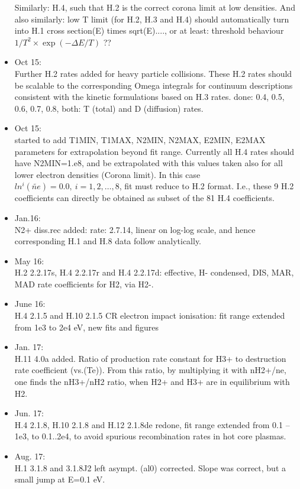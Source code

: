 \documentclass[12pt,dvipdfmx]{article}
\begin{document}
\begin{itemize}
 Similarly: H.4, such that H.2 is the correct corona limit at low densities. And also similarly: low T limit (for H.2, H.3 and H.4)
 should automatically turn into H.1 cross section(E) times sqrt(E)...., or at least:
 threshold behaviour $1/T^2\times \exp(-\Delta E/T)$ ??
\item Oct 15:\\
Further H.2 rates added for heavy particle collisions. These H.2 rates should be scalable to
the corresponding Omega integrals for continuum descriptions consistent with the kinetic formulations based on H.3 rates.
done: 0.4, 0.5, 0.6, 0.7, 0.8, both: T (total) and D (diffusion) rates.
\item Oct 15:\\
 started to add T1MIN, T1MAX, N2MIN, N2MAX, E2MIN, E2MAX parameters for extrapolation beyond fit range.
Currently all H.4 rates should have N2MIN=1.e8,
and be extrapolated with this values taken also for all
lower electron densities (Corona limit). In this case $ln^i(\tilde{ne})=0.0,  \ i=1,2,\dots,8$, fit must reduce to H.2 format.
I.e., these 9 H.2 coefficients can directly be obtained as subset of the 81 H.4 coefficients.
\item Jan.16: \\
N2+ diss.rec added: rate: 2.7.14, linear on log-log scale, and hence corresponding H.1 and H.8 data follow analytically.
\item May 16: \\
H.2 2.2.17s,  H.4 2.2.17r and H.4 2.2.17d: effective, H- condensed, DIS, MAR, MAD rate coefficients for H2, via H2-.
\item June 16: \\
H.4 2.1.5 and H.10 2.1.5 CR electron impact ionisation: fit range extended from 1e3 to 2e4 eV, new fits and figures
\item Jan. 17: \\
H.11   4.0a added. Ratio of production rate constant for H3+ to destruction rate coefficient (vs.(Te)). From this ratio,
by multiplying it with nH2+/ne, one finds the nH3+/nH2 ratio, when H2+ and H3+ are in equilibrium with H2.
\item Jun. 17: \\
H.4 2.1.8, H.10  2.1.8 and H.12  2.1.8de redone, fit range extended from 0.1 --1e3, to 0.1..2e4, to avoid spurious recombination
rates in hot core plasmas.
\item Aug. 17: \\
H.1  3.1.8 and 3.1.8J2 left asympt. (al0) corrected. Slope was correct, but a small jump at E=0.1 eV.

\end{itemize}
\end{document}
